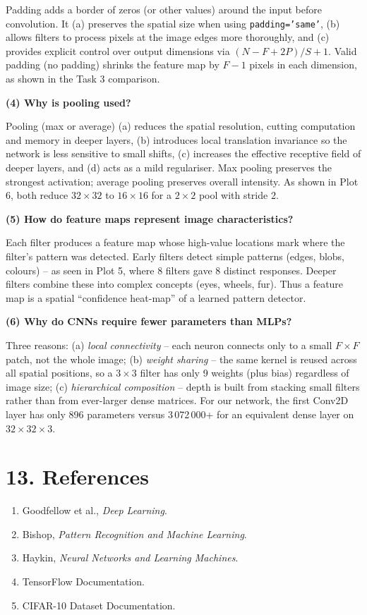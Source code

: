 \documentclass[11pt]{article}
\begin{document}
Padding adds a border of zeros (or other values) around the input before convolution. It (a) preserves the spatial size when using \texttt{padding='same'}, (b) allows filters to process pixels at the image edges more thoroughly, and (c) provides explicit control over output dimensions via $(N-F+2P)/S+1$. Valid padding (no padding) shrinks the feature map by $F-1$ pixels in each dimension, as shown in the Task 3 comparison.

\textbf{(4) Why is pooling used?}

Pooling (max or average) (a) reduces the spatial resolution, cutting computation and memory in deeper layers, (b) introduces local translation invariance so the network is less sensitive to small shifts, (c) increases the effective receptive field of deeper layers, and (d) acts as a mild regulariser. Max pooling preserves the strongest activation; average pooling preserves overall intensity. As shown in Plot 6, both reduce $32\times32$ to $16\times16$ for a $2\times2$ pool with stride 2.

\textbf{(5) How do feature maps represent image characteristics?}

Each filter produces a feature map whose high-value locations mark where the filter's pattern was detected. Early filters detect simple patterns (edges, blobs, colours) -- as seen in Plot 5, where 8 filters gave 8 distinct responses. Deeper filters combine these into complex concepts (eyes, wheels, fur). Thus a feature map is a spatial ``confidence heat-map'' of a learned pattern detector.

\textbf{(6) Why do CNNs require fewer parameters than MLPs?}

Three reasons: (a) \emph{local connectivity} -- each neuron connects only to a small $F\times F$ patch, not the whole image; (b) \emph{weight sharing} -- the same kernel is reused across all spatial positions, so a $3\times3$ filter has only 9 weights (plus bias) regardless of image size; (c) \emph{hierarchical composition} -- depth is built from stacking small filters rather than from ever-larger dense matrices. For our network, the first Conv2D layer has only 896 parameters versus 3\,072\,000+ for an equivalent dense layer on $32\times32\times3$.

\section*{13. References}

\begin{enumerate}
\item Goodfellow et al., \emph{Deep Learning}.
\item Bishop, \emph{Pattern Recognition and Machine Learning}.
\item Haykin, \emph{Neural Networks and Learning Machines}.
\item TensorFlow Documentation.
\item CIFAR-10 Dataset Documentation.
\end{enumerate}
\end{document}
